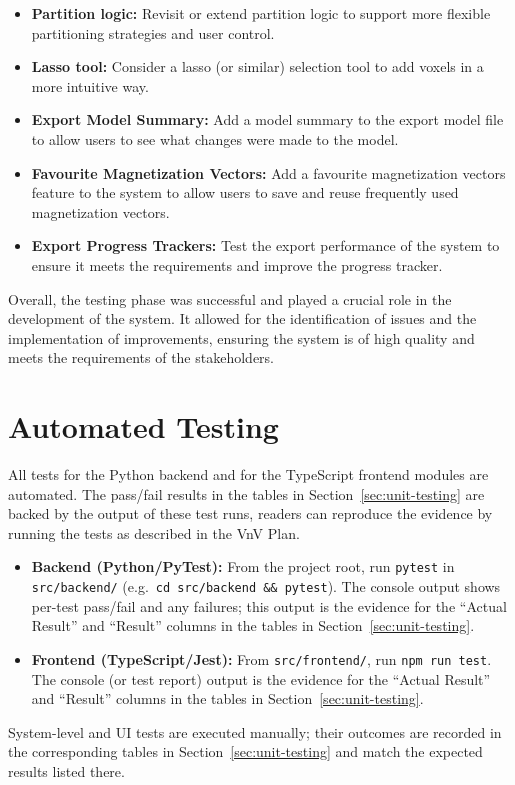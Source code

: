 \documentclass[12pt, titlepage]{article}
\begin{document}
\begin{itemize}
  \item \textbf{Partition logic:} Revisit or extend partition logic to support more flexible partitioning strategies and user control.
  \item \textbf{Lasso tool:} Consider a lasso (or similar) selection tool to add voxels in a more intuitive way.
  \item \textbf{Export Model Summary:} Add a model summary to the export model file to allow users to see what changes were made to the model.
  \item \textbf{Favourite Magnetization Vectors:} Add a favourite magnetization vectors feature to the system to allow users to save and reuse frequently used magnetization vectors.
  \item \textbf{Export Progress Trackers:} Test the export performance of the system to ensure it meets the requirements and improve the progress tracker.
\end{itemize}

Overall, the testing phase was successful and played a crucial role in the development of the system. It allowed for the identification of issues and the implementation of improvements, ensuring the system is of high quality and meets the requirements of the stakeholders.

\section{Automated Testing}\label{sec:automated-testing}

All tests for the Python backend and for the TypeScript frontend modules are automated. The pass/fail results in the tables in Section~\ref{sec:unit-testing} are backed by the output of these test runs, readers can reproduce the evidence by running the tests as described in the VnV Plan.

\begin{itemize}
  \item \textbf{Backend (Python/PyTest):} From the project root, run \texttt{pytest} in \texttt{src/backend/} (e.g.\ \texttt{cd src/backend \&\& pytest}). The console output shows per-test pass/fail and any failures; this output is the evidence for the ``Actual Result'' and ``Result'' columns in the tables in Section~\ref{sec:unit-testing}.
  \item \textbf{Frontend (TypeScript/Jest):} From \texttt{src/frontend/}, run \texttt{npm run test}. The console (or test report) output is the evidence for the ``Actual Result'' and ``Result'' columns in the tables in Section~\ref{sec:unit-testing}.
\end{itemize}
System-level and UI tests are executed manually; their outcomes are recorded in the corresponding tables in Section~\ref{sec:unit-testing} and match the expected results listed there.
\end{document}
